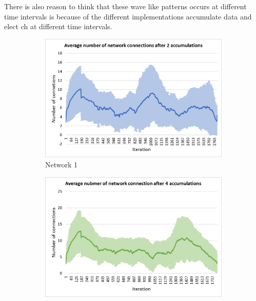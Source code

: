 \documentclass[USenglish]{uit-thesis}
\begin{document}
There is also reason to think that these wave like patterns occurs at different time intervals is because of the different implementations accumulate data and elect \gls{ch} at different time intervals.




\begin{figure} [ht]
        \centering
        \begin{subfigure}[b]{0.475\textwidth}
            \centering
            \includegraphics[width=\textwidth]{numConn_stdev_2.png}
            \caption[Network2]%
            {{\small Network 1}}    
            \label{fig:connfig1}
        \end{subfigure}
        \hfill
        \begin{subfigure}[b]{0.475\textwidth}  
            \centering 
            \includegraphics[width=\textwidth]{numConn_stdev_4.png}

\end{subfigure}
\end{figure}
\end{document}

